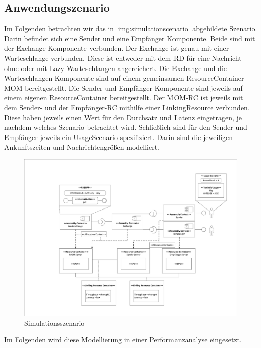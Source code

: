 \subsection{Anwendungszenario}
Im Folgenden betrachten wir das in \autoref{img:simulationscenario} abgebildete Szenario. Darin befindet sich eine Sender und eine Empfänger Komponente. Beide sind mit der Exchange Komponente verbunden. Der Exchange ist genau mit einer Warteschlange verbunden. Diese ist entweder mit dem RD für eine Nachricht ohne oder mit Lazy-Warteschlangen angereichert. Die Exchange und die Warteschlangen Komponente sind auf einem gemeinsamen ResourceContainer MOM bereitgestellt. Die Sender und Empfänger Komponente sind jeweils auf einem eigenen ResourceContainer bereitgestellt. Der MOM-RC ist jeweils mit dem Sender- und der Empfänger-RC mithilfe einer LinkingResource verbunden. Diese haben jeweils einen Wert für den Durchsatz und Latenz eingetragen, je nachdem welches Szenario betrachtet wird. Schließlich sind für den Sender und Empfänger jeweils ein UsageScenario spezifiziert. Darin sind die jeweiligen Ankunftszeiten und Nachrichtengrößen modelliert.
\begin{figure}
\center
  \includegraphics[width=1\textwidth]{images/modelSimulationResults/simulationScenario.pdf}
  \caption{Simulationsszenario }
  \label{img:simulationscenario}
\end{figure}
Im Folgenden wird diese Modellierung in einer Performanzanalyse eingesetzt.


